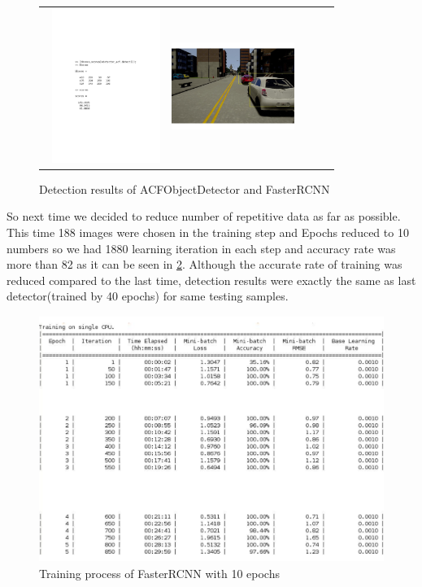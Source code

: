\begin{figure}
\begin{tabular}{ lccc }
\includegraphics[width=4cm, height=5cm]{images/acfTest4.pdf} 
\includegraphics[width=4cm, height=5cm]{images/test4ACFview.pdf}
\end{tabular}
\caption{Detection results of ACFObjectDetector and FasterRCNN}
\label{fig:rcnnVsACFResult}
\end{figure}

So next time we decided to reduce number of repetitive data as far as possible. This time 188 images were chosen in the training step and Epochs reduced to 10 numbers so we had 1880 learning iteration in each step and accuracy rate was more than 82 as it can be seen in \ref{fig:RCNN10E}. Although the accurate rate of training was reduced compared to the last time, detection results were exactly the same as last detector(trained by 40 epochs) for same testing samples.
\begin{figure}
         \includegraphics[width=14cm, height=8cm]{images/2.pdf}
    \caption{Training process of FasterRCNN with 10 epochs}
    \label{fig:RCNN10E}
\end{figure}
